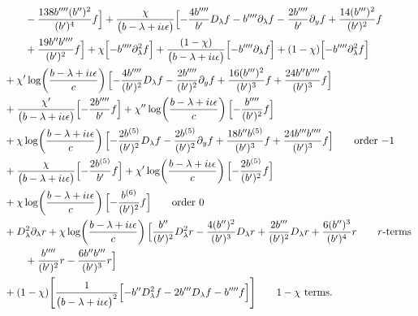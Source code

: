 \documentclass[reqno,11pt]{amsart}
\numberwithin{equation}{section}
\newcommand{\p}{\partial}
\newcommand{\D}{D_\lambda}
\numberwithin{equation}{section} %
\begin{document}
\begin{enumerate}
\begin{align}
&\qquad - \frac{138 b''''  (b'' )^{2}}{(b' )^{4}} f\Bigr]+\frac{\chi}{\bigl(b -\lambda+i\iota\epsilon\bigr)}\Bigl[- \frac{4 b'''' }{b' } \D f- b''''  \p_\lambda f- \frac{2 b'''' }{b' } \p_y f+\frac{14 (b''' )^{2}}{(b' )^{2}} f\notag\\
&\qquad +\frac{19 b''  b'''' }{(b' )^{2}} f\Bigr]+\chi\Bigl[- b''''  \p_\lambda^2 f\Bigr]+\frac{(1-\chi)}{\bigl(b -\lambda+i\iota\epsilon\bigr)}\Bigl[- b''''  \p_\lambda f\Bigr]+(1-\chi)\Bigl[- b''''  \p_\lambda^2 f\Bigr]\notag\\
&+\chi'\log\!\left(\frac{b -\lambda+i\iota\epsilon}{c}\right)\Bigl[- \frac{4 b'''' }{(b' )^{2}} \D f- \frac{2 b'''' }{(b' )^{2}} \p_y f+\frac{16 (b''' )^{2}}{(b' )^{3}} f+\frac{24 b''  b'''' }{(b' )^{3}} f\Bigr]\notag\\
&+\frac{\chi'}{\bigl(b -\lambda+i\iota\epsilon\bigr)}\Bigl[- \frac{2 b'''' }{b' } f\Bigr]+\chi''\log\!\left(\frac{b -\lambda+i\iota\epsilon}{c}\right)\Bigl[- \frac{b'''' }{(b' )^{2}} f\Bigr]\notag\\
&+\chi\log\!\left(\frac{b -\lambda+i\iota\epsilon}{c}\right)\Bigl[- \frac{2 b^{(5)} }{(b' )^{2}} \D f- \frac{2 b^{(5)} }{(b' )^{2}} \p_y f+\frac{18 b''  b^{(5)} }{(b' )^{3}} f+\frac{24 b'''  b'''' }{(b' )^{3}} f\Bigr]\tag*{\text{order $-1$}}\\
&+\frac{\chi}{\bigl(b -\lambda+i\iota\epsilon\bigr)}\Bigl[- \frac{2 b^{(5)} }{b' } f\Bigr]+\chi'\log\!\left(\frac{b -\lambda+i\iota\epsilon}{c}\right)\Bigl[- \frac{2 b^{(5)} }{(b' )^{2}} f\Bigr]\notag\\
&+\chi\log\!\left(\frac{b -\lambda+i\iota\epsilon}{c}\right)\Bigl[- \frac{b^{(6)} }{(b' )^{2}} f\Bigr]\tag*{\text{order $0$}}\\
&+\D^2\p_\lambda r+\chi\log\!\left(\frac{b -\lambda+i\iota\epsilon}{c}\right)\Bigl[\frac{b'' }{(b' )^{2}} \D^2 r- \frac{4 (b'' )^{2}}{(b' )^{3}} \D r+\frac{2 b''' }{(b' )^{2}} \D r+\frac{6 (b'' )^{3}}{(b' )^{4}} r\tag*{\text{$r$-terms}}\\
&\qquad +\frac{b'''' }{(b' )^{2}} r- \frac{6 b''  b''' }{(b' )^{3}} r\Bigr]\notag\\
&+(1-\chi)\Bigg[\frac{1}{\bigl(b -\lambda+i\iota\epsilon\bigr)^{2}}\Bigl[- b''  \D^2 f- 2 b'''  \D f- b''''  f\Bigr]\Bigg]\tag*{\text{$1-\chi$ terms}}.\\
&
\end{align}
\end{enumerate}
\end{document}
